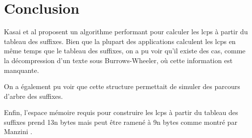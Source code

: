 \documentclass[a4paper,10pt]{article}
\begin{document}

\section{Conclusion}
\label{sec:conclusion}


Kasai et al proposent un algorithme performant pour calculer les lcps
à partir du tableau des suffixes. Bien que la plupart des applications
calculent les lcps en même temps que le tableau des suffixes, on a pu
voir qu'il existe des cas, comme la décompression d'un texte sous
Burrows-Wheeler, où cette information est manquante.

On a également pu voir que cette structure permettait de simuler des
parcours d'arbre des suffixes.

Enfin, l'espace mémoire requis pour construire les lcps à partir du
tableau des suffixes prend 13n bytes mais peut être ramené à 9n bytes
comme montré par Manzini \cite{Manzini04}.




\end{document}
